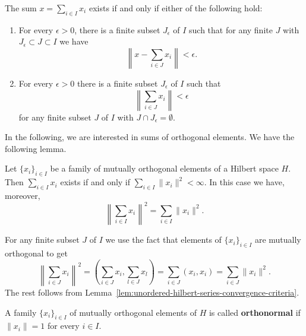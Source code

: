 \begin{Lemma}
\label{lem:unordered-hilbert-series-convergence-criteria}
The sum $x=\sum_{i\in I}x_i$ exists if and only if either of the following hold:\begin{enumerate}
\item For every $\epsilon>0$, there is a finite subset $J_\epsilon$ of $I$ such that for any finite $J$ with $J_\epsilon\subset J\subset I$ we have
\begin{equation}\label{eq:hilbert-series-finite-sum-approximation}
\left\|x-\sum_{i\in J}x_i\right\|<\epsilon.
\end{equation}

\item For every $\epsilon>0$ there is a finite subset $J_\epsilon$ of $I$ such that
\begin{equation}\label{eq:hilbert-series-finite-tail-cauchy-condition}
\left\|\sum_{i\in J}x_i\right\|<\epsilon
\end{equation}
for any finite subset $J$ of $I$ with $J\cap J_\epsilon=\emptyset$.\end{enumerate}
\end{Lemma}

In the following, we are interested in sums of orthogonal elements. We have the following lemma.

\begin{Lemma}
\label{lem:orthogonal-series-summability}
Let $\{x_i\}_{i\in I}$ be a family of mutually orthogonal elements of a Hilbert space $H$. Then $\sum_{i\in I}x_i$ exists if and only if $\sum_{i\in I}\|x_i\|^2<\infty$. In this case we have, moreover,
\begin{equation}\label{eq:orthogonal-series-pythagorean-norm}
\left\|\sum_{i\in I}x_i\right\|^2=\sum_{i\in I}\|x_i\|^2.
\end{equation}

\end{Lemma}

\begin{Proof}
For any finite subset $J$ of $I$ we use the fact that elements of $\{x_i\}_{i\in I}$ are mutually orthogonal to get
\begin{equation}\label{eq:finite-orthogonal-sum-norm-calculation}
\left\|\sum_{i\in J}x_i\right\|^2=\left(\sum_{i\in J}x_i,\sum_{l\in J}x_l\right)=\sum_{i\in J}(x_i,x_i)=\sum_{i\in J}\|x_i\|^2.
\end{equation}
The rest follows from Lemma~\ref{lem:unordered-hilbert-series-convergence-criteria}.
\end{Proof}

\begin{Definition}
\label{def:orthonormal-family}
A family $\{x_i\}_{i\in I}$ of mutually orthogonal elements of $H$ is called \textbf{orthonormal} if $\|x_i\|=1$ for every $i\in I$.
\end{Definition}
